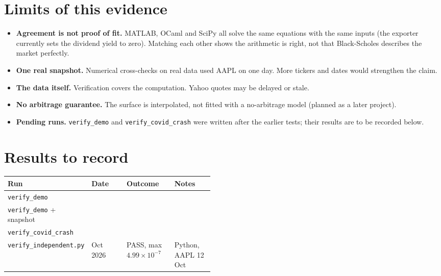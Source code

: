 \documentclass[11pt]{article}
\begin{document}
\section{Limits of this evidence}
\begin{itemize}[leftmargin=1.5em]
\item \textbf{Agreement is not proof of fit.} MATLAB, OCaml and SciPy all solve the same equations with the same inputs (the exporter currently sets the dividend yield to zero). Matching each other shows the arithmetic is right, not that Black-Scholes describes the market perfectly.
\item \textbf{One real snapshot.} Numerical cross-checks on real data used AAPL on one day. More tickers and dates would strengthen the claim.
\item \textbf{The data itself.} Verification covers the computation. Yahoo quotes may be delayed or stale.
\item \textbf{No arbitrage guarantee.} The surface is interpolated, not fitted with a no-arbitrage model (planned as a later project).
\item \textbf{Pending runs.} \texttt{verify\_demo} and \texttt{verify\_covid\_crash} were written after the earlier tests; their results are to be recorded below.
\end{itemize}

\section{Results to record}
\begin{tabularx}{\linewidth}{@{}>{\raggedright\arraybackslash}p{0.3\linewidth}>{\raggedright\arraybackslash}p{0.17\linewidth}XX@{}}
\toprule
\textbf{Run} & \textbf{Date} & \textbf{Outcome} & \textbf{Notes}\\\midrule
\texttt{verify\_demo} & & & \\[1.4em]
\texttt{verify\_demo} + snapshot & & & \\[1.4em]
\texttt{verify\_covid\_crash} & & & \\[1.4em]
\texttt{verify\_independent.py} & 25 Oct 2026 & PASS, max $4.99\times10^{-7}$ & Python, AAPL 12 Oct\\\bottomrule
\end{tabularx}
\end{document}
